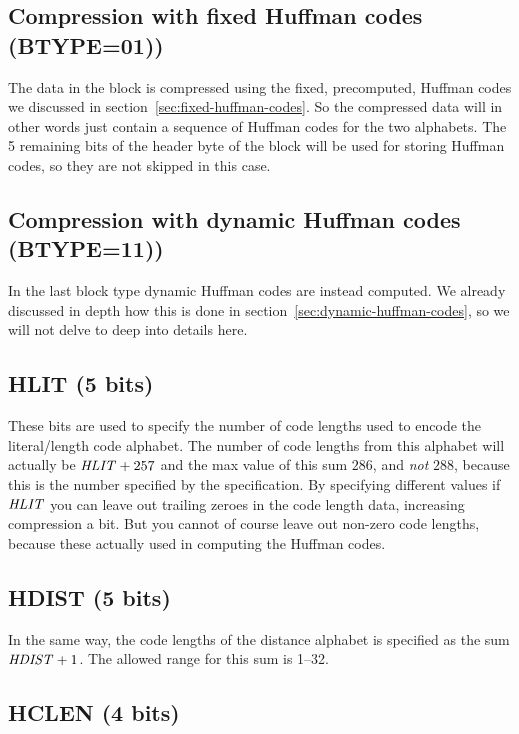 \subsection{Compression with fixed Huffman codes (BTYPE=01))}

The data in the block is compressed using the fixed, precomputed,
Huffman codes we discussed in
section~\ref{sec:fixed-huffman-codes}. So the compressed data will in
other words just contain a sequence of Huffman codes for the two
alphabets. The 5 remaining bits of the header byte of the block will
be used for storing Huffman codes, so they are not skipped in this
case.

\subsection{Compression with dynamic Huffman codes (BTYPE=11))}

In the last block type dynamic Huffman codes are instead computed. We
already discussed in depth how this is done in
section~\ref{sec:dynamic-huffman-codes}, so we will not delve to deep
into details here.

\subsection{HLIT (5 bits)}

These bits are used to specify the number of code lengths used to
encode the literal/length code alphabet. The number of code lengths
from this alphabet will actually be $\mathit{HLIT} + 257$ and the max
value of this sum $286$, and \textit{not} $288$, because this is the
number specified by the  specification. By specifying different
values if $\mathit{HLIT}$ you can leave out trailing zeroes in the code
length data, increasing compression a bit. But you cannot of course
leave out non-zero code lengths, because these actually used in
computing the Huffman codes.

\subsection{HDIST (5 bits)}

In the same way, the code lengths of the distance alphabet is
specified as the sum $\mathit{HDIST} + 1$. The allowed range for this sum
is 1--32.


\subsection{HCLEN (4 bits)}

